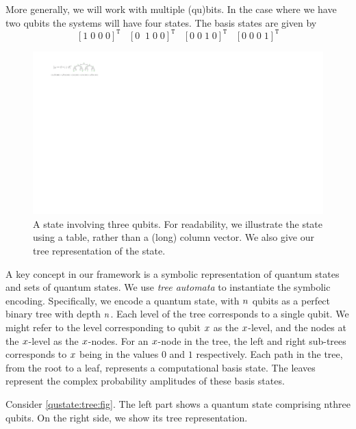 More generally, we will work with multiple (qu)bits.
%
In the case where we have two qubits the systems will have four states.
%
The basis states are given by 
\[
\left[
1\;0\;0\;0
\right]^{\mathtt T}
\;\;\;
\left[
0\;\;1\;0\;0
\right]^{\mathtt T}
\;\;\;
\left[
0\;0\;1\;0
\right]^{\mathtt T}
\;\;\;
\left[
0\;0\;0\;1
\right]^{\mathtt T}
\]


\begin{figure}
\includegraphics[scale=1]{figures/States/state3}
\caption{A state involving three qubits. For readability, we illustrate the state using a  table, rather than a (long) column vector. We also give our tree representation of the state.}
\label{triple:qbit:state:fig}
\end{figure}

A key concept in our framework is a symbolic representation of quantum states and sets of quantum states.
%
We use {\it tree automata} to instantiate the symbolic encoding.
%
Specifically, we encode a quantum state, with $n$ qubits as a perfect binary tree with depth $n$.
%
Each level of the tree corresponds to a single qubit. 
%
We might refer to the level corresponding to qubit $x$ as the $x$-level, and the nodes at the $x$-level as the $x$-nodes.
%
For an $x$-node in the tree,  the left and right sub-trees corresponds to $x$ being in the values $0$ and $1$ respectively.
%
Each path in the tree, from the root to a leaf, represents a computational basis state.
%
The leaves represent the complex probability amplitudes of these basis states.

Consider \cref{qustate:tree:fig}.
%
The left part shows a quantum state comprising nthree qubits.
%
On the right side, we show its tree representation.
%



